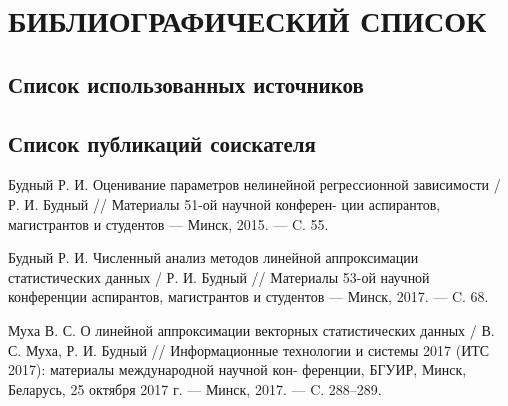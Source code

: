 \chapter*{БИБЛИОГРАФИЧЕСКИЙ СПИСОК}

\section*{Список использованных источников}

    {
\renewcommand{\chapter}[2]{}

}

\section*{Список публикаций соискателя}

\noindent [1"---A.] Будный Р. И.
Оценивание параметров нелинейной регрессионной
\hspace*{16.5mm} зависимости / Р. И. Будный // Материалы 51-ой научной конферен-
\hspace*{17mm} ции аспирантов, магистрантов и студентов --- Минск, 2015. --- C. 55.

\noindent [2"---A.] Будный Р. И.
Численный анализ методов линейной аппроксимации
\hspace*{15.5mm} статистических данных / Р. И. Будный // Материалы 53-ой научной
\hspace*{16mm} конференции аспирантов, магистрантов и студентов --- Минск, 2017.
\hspace*{16.5mm} --- C. 68.

\noindent [3"---A.] Муха В. С.
О линейной аппроксимации векторных статистических
\hspace*{15.5mm} данных / В. С. Муха, Р. И. Будный // Информационные технологии
\hspace*{16.5mm} и системы 2017 (ИТС 2017): материалы международной научной кон-
\hspace*{15.5mm} ференции, БГУИР, Минск, Беларусь, 25 октября 2017 г. --- Минск,
\hspace*{16.5mm} 2017. --- C. 288--289.
